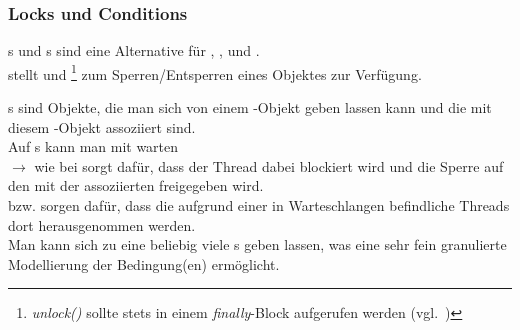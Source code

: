 \subsubsection{Locks und Conditions}\label{subsubsec:locksconditions}
s und s sind eine Alternative für , , und .\\

\noindent
{} stellt  und \footnote{
    \textit{unlock()} sollte stets in einem \textit{finally}-Block aufgerufen werden (vgl.~\cite[150]{Oec22})
} zum Sperren/Entsperren eines Objektes zur Verfügung.

\noindent
{}s sind Objekte, die man sich von einem -Objekt geben lassen kann und die mit diesem -Objekt assoziiert sind.\\
Auf s kann man mit  warten\\
$\rightarrow$ wie bei  sorgt  dafür, dass der Thread dabei blockiert wird und die Sperre auf den mit der  assoziierten  freigegeben wird.\\
 bzw.  sorgen dafür, dass die aufgrund einer  in Warteschlangen befindliche Threads dort herausgenommen werden.\\

\noindent
Man kann sich zu eine  beliebig viele s geben lassen, was eine sehr fein granulierte Modellierung der Bedingung(en) ermöglicht.\\

